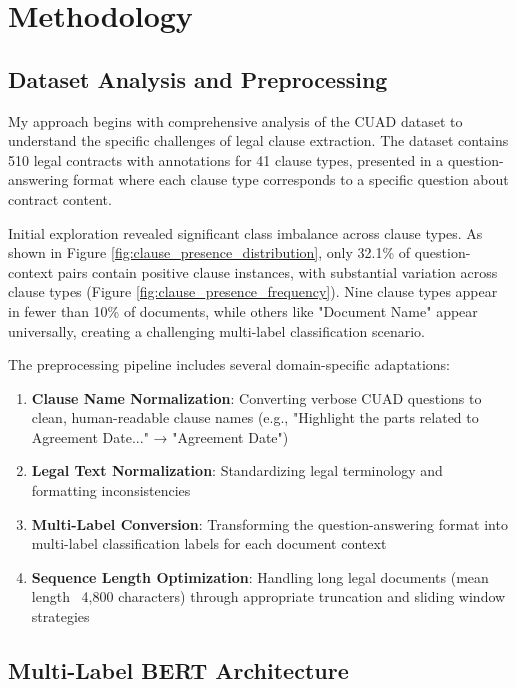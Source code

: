 \section{Methodology}

\subsection{Dataset Analysis and Preprocessing}

My approach begins with comprehensive analysis of the CUAD dataset to understand the specific challenges of legal clause extraction. The dataset contains 510 legal contracts with annotations for 41 clause types, presented in a question-answering format where each clause type corresponds to a specific question about contract content.

Initial exploration revealed significant class imbalance across clause types. As shown in Figure \ref{fig:clause_presence_distribution}, only 32.1\% of question-context pairs contain positive clause instances, with substantial variation across clause types (Figure \ref{fig:clause_presence_frequency}). Nine clause types appear in fewer than 10\% of documents, while others like "Document Name" appear universally, creating a challenging multi-label classification scenario.

The preprocessing pipeline includes several domain-specific adaptations:

\begin{enumerate}
    \item \textbf{Clause Name Normalization}: Converting verbose CUAD questions to clean, human-readable clause names (e.g., "Highlight the parts related to Agreement Date..." → "Agreement Date")
    \item \textbf{Legal Text Normalization}: Standardizing legal terminology and formatting inconsistencies
    \item \textbf{Multi-Label Conversion}: Transforming the question-answering format into multi-label classification labels for each document context
    \item \textbf{Sequence Length Optimization}: Handling long legal documents (mean length ~4,800 characters) through appropriate truncation and sliding window strategies
\end{enumerate}

\subsection{Multi-Label BERT Architecture}

